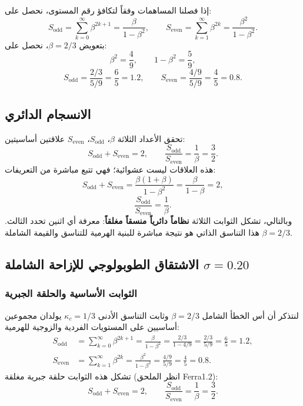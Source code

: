 \documentclass[11pt,a4paper]{article}
\begin{document}
	إذا فصلنا المساهمات وفقاً لتكافؤ رقم المستوى، نحصل على:
	\[
	S_{\text{odd}} = \sum_{k=0}^{\infty} \beta^{2k+1} = \frac{\beta}{1-\beta^2},
	\qquad
	S_{\text{even}} = \sum_{k=1}^{\infty} \beta^{2k} = \frac{\beta^2}{1-\beta^2}.
	\]
	بتعويض \(\beta = 2/3\)، نحصل على:
	\[
	\beta^2 = \frac{4}{9},\qquad 1-\beta^2 = \frac{5}{9},
	\]
	\[
	S_{\text{odd}} = \frac{2/3}{5/9} = \frac{6}{5}=1.2,\qquad
	S_{\text{even}} = \frac{4/9}{5/9} = \frac{4}{5}=0.8.
	\]
	
	\subsection{الانسجام الدائري}
	تحقق الأعداد الثلاثة \(\beta\)، \(S_{\text{odd}}\)، \(S_{\text{even}}\) علاقتين أساسيتين:
	\[
	S_{\text{odd}} + S_{\text{even}} = 2,\qquad
	\frac{S_{\text{odd}}}{S_{\text{even}}} = \frac{1}{\beta} = \frac{3}{2}.
	\]
	هذه العلاقات ليست عشوائية؛ فهي تتبع مباشرة من التعريفات:
	\[
	S_{\text{odd}} + S_{\text{even}} = \frac{\beta(1+\beta)}{1-\beta^2} = \frac{\beta}{1-\beta}=2,
	\]
	\[
	\frac{S_{\text{odd}}}{S_{\text{even}}} = \frac{1}{\beta}.
	\]
	وبالتالي، تشكل الثوابت الثلاثة \textbf{نظاماً دائرياً منسقاً مغلقاً}: معرفة أي اثنين تحدد الثالث. هذا التناسق الذاتي هو نتيجة مباشرة للبنية الهرمية للتناسق والقيمة الشاملة \(\beta=2/3\).
	
	\subsection{الاشتقاق الطوبولوجي للإزاحة الشاملة \(\sigma = 0.20\)}
	\label{sec:sigma_topology}
	
	\subsubsection{الثوابت الأساسية والحلقة الجبرية}
	
	لنتذكر أن أس الخطأ الشامل \(\beta = 2/3\) وثابت التناسق الأدنى \(\kappa_c = 1/3\) يولدان مجموعين أساسيين على المستويات الفردية والزوجية للهرمية:
	\begin{align}
		S_{\mathrm{odd}} &= \sum_{k=0}^{\infty} \beta^{2k+1} = \frac{\beta}{1-\beta^2} = \frac{2/3}{1-4/9} = \frac{2/3}{5/9} = \frac{6}{5} = 1.2, \label{eq:Sodd_again}\\
		S_{\mathrm{even}} &= \sum_{k=1}^{\infty} \beta^{2k} = \frac{\beta^2}{1-\beta^2} = \frac{4/9}{5/9} = \frac{4}{5} = 0.8. \label{eq:Seven_again}
	\end{align}
	تشكل هذه الثوابت حلقة جبرية مغلقة (انظر الملحق Ferra1.2):
	\[
	S_{\mathrm{odd}} + S_{\mathrm{even}} = 2, \qquad \frac{S_{\mathrm{odd}}}{S_{\mathrm{even}}} = \frac{1}{\beta} = \frac{3}{2}.
	\]
	
\end{document}

